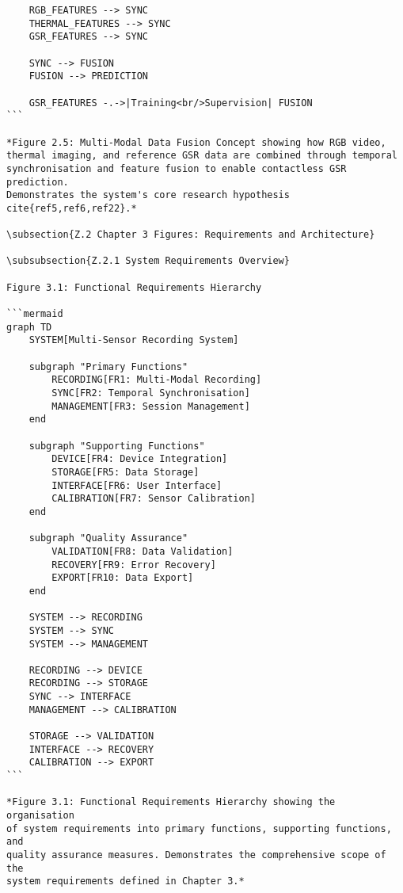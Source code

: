 \begin{verbatim}
    RGB_FEATURES --> SYNC
    THERMAL_FEATURES --> SYNC
    GSR_FEATURES --> SYNC

    SYNC --> FUSION
    FUSION --> PREDICTION

    GSR_FEATURES -.->|Training<br/>Supervision| FUSION
```

*Figure 2.5: Multi-Modal Data Fusion Concept showing how RGB video,
thermal imaging, and reference GSR data are combined through temporal
synchronisation and feature fusion to enable contactless GSR prediction.
Demonstrates the system's core research hypothesis cite{ref5,ref6,ref22}.*

\subsection{Z.2 Chapter 3 Figures: Requirements and Architecture}

\subsubsection{Z.2.1 System Requirements Overview}

Figure 3.1: Functional Requirements Hierarchy

```mermaid
graph TD
    SYSTEM[Multi-Sensor Recording System]

    subgraph "Primary Functions"
        RECORDING[FR1: Multi-Modal Recording]
        SYNC[FR2: Temporal Synchronisation]
        MANAGEMENT[FR3: Session Management]
    end

    subgraph "Supporting Functions"
        DEVICE[FR4: Device Integration]
        STORAGE[FR5: Data Storage]
        INTERFACE[FR6: User Interface]
        CALIBRATION[FR7: Sensor Calibration]
    end

    subgraph "Quality Assurance"
        VALIDATION[FR8: Data Validation]
        RECOVERY[FR9: Error Recovery]
        EXPORT[FR10: Data Export]
    end

    SYSTEM --> RECORDING
    SYSTEM --> SYNC
    SYSTEM --> MANAGEMENT

    RECORDING --> DEVICE
    RECORDING --> STORAGE
    SYNC --> INTERFACE
    MANAGEMENT --> CALIBRATION

    STORAGE --> VALIDATION
    INTERFACE --> RECOVERY
    CALIBRATION --> EXPORT
```

*Figure 3.1: Functional Requirements Hierarchy showing the organisation
of system requirements into primary functions, supporting functions, and
quality assurance measures. Demonstrates the comprehensive scope of the
system requirements defined in Chapter 3.*


\end{verbatim}
